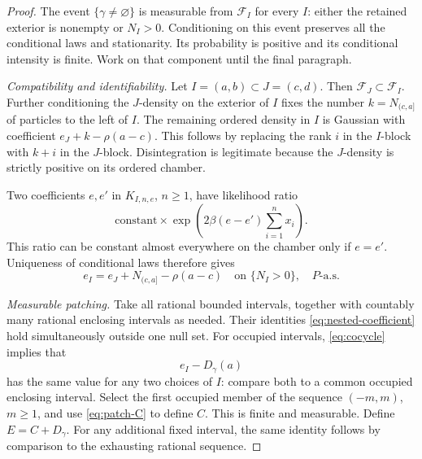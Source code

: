 \documentclass[11pt,reqno]{amsart}
\theoremstyle{definition}
\theoremstyle{remark}
\newcommand{\1}{\mathbf 1}
\newcommand{\cF}{\mathcal F}
\numberwithin{equation}{section}
\begin{document}
\begin{proof}
The event $\{\gamma\ne\varnothing\}$ is measurable from $\cF_I$
for every $I$: either the retained exterior is nonempty or $N_I>0$.
Conditioning on this event preserves all the conditional laws and
stationarity. Its probability is positive and its conditional intensity
is finite. Work on that component until the final paragraph.

\emph{Compatibility and identifiability.}
Let $I=(a,b)\subset J=(c,d)$. Then $\cF_J\subset\cF_I$.
Further conditioning the $J$-density on the exterior of $I$ fixes the
number $k=N_{(c,a]}$ of particles to the left of $I$. The remaining
ordered density in $I$ is Gaussian with coefficient
$e_J+k-\rho(a-c)$. This follows by replacing the rank $i$ in the
$I$-block with $k+i$ in the $J$-block. Disintegration is legitimate
because the $J$-density is strictly positive on its ordered chamber.

Two coefficients $e,e'$ in $K_{I,n,e}$, $n\ge1$, have likelihood ratio
\[
\text{constant}\times\exp\left(2\beta(e-e')\sum_{i=1}^n x_i\right).
\]
This ratio can be constant almost everywhere on the chamber only if
$e=e'$. Uniqueness of conditional laws therefore gives
\begin{equation}\label{eq:nested-coefficient}
e_I=e_J+N_{(c,a]}-\rho(a-c)
\quad\text{on }\{N_I>0\},\quad P\text{-a.s.}
\end{equation}

\emph{Measurable patching.}
Take all rational bounded intervals, together with countably many
rational enclosing intervals as needed. Their identities
\eqref{eq:nested-coefficient} hold simultaneously outside one null set.
For occupied intervals, \eqref{eq:cocycle} implies that
\begin{equation}\label{eq:patch-C}
e_I-D_\gamma(a)
\end{equation}
has the same value for any two choices of $I$: compare both to a common
occupied enclosing interval. Select the first occupied member of the
sequence $(-m,m)$, $m\ge1$, and use \eqref{eq:patch-C} to define $C$.
This is finite and measurable. Define $E=C+D_\gamma$.
For any additional fixed interval, the same identity follows by
comparison to the exhausting rational sequence.


\end{proof}
\end{document}

